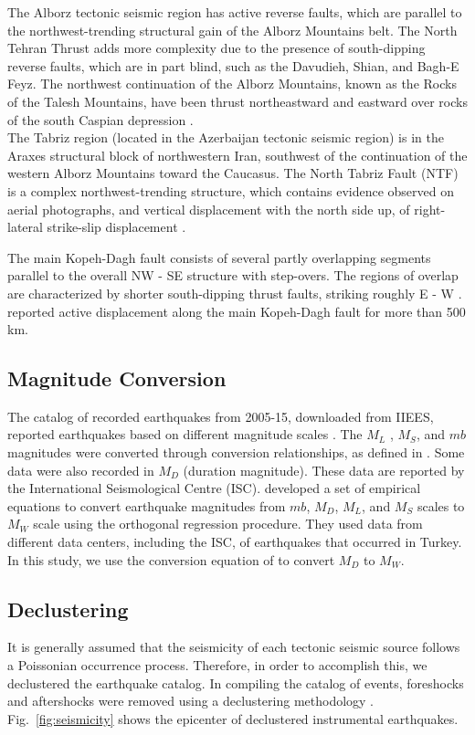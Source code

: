\noindent
The Alborz tectonic seismic region has active reverse faults, which are parallel to the northwest-trending structural gain of the Alborz Mountains belt. The North Tehran Thrust adds more complexity due to the presence of south-dipping reverse faults, which are in part blind, such as the Davudieh, Shian, and Bagh-E Feyz. The northwest continuation of the Alborz Mountains, known as the Rocks of the Talesh Mountains, have been thrust northeastward and eastward over rocks of the south Caspian depression  \citep{Berberian1999}.\\ 
\noindent
The Tabriz region (located in the Azerbaijan tectonic seismic region) is in the Araxes structural block of northwestern Iran, southwest of the continuation of the western Alborz Mountains toward the Caucasus. The North Tabriz Fault (NTF) is a complex northwest-trending structure, which contains evidence observed on aerial photographs, and vertical displacement with the north side up, of right-lateral strike-slip displacement  \citep{Berberian1999}.

The main Kopeh-Dagh fault consists of several partly overlapping segments parallel to the overall  NW - SE  structure with step-overs. The regions of overlap are characterized by shorter south-dipping thrust faults, striking roughly E - W  \citep{Berberian2001}.  \citet{Trifonov1978}  reported active displacement along the main Kopeh-Dagh fault for more than 500 km. 

\subsection{Magnitude Conversion}
\noindent
The catalog of recorded earthquakes from 2005-15, downloaded from IIEES, reported earthquakes based on different magnitude scales \citep{IIEES}. The  $M_L$ ,  $M_S$, and  $mb$  magnitudes were converted through conversion relationships, as defined in  \citet{Zare2014}. Some data were also recorded in  $M_D$  (duration magnitude). These data are reported by the International Seismological Centre (ISC).   \citet{Deniz2010}  developed a set of empirical equations to convert earthquake magnitudes from  $mb$,  $M_D$,  $M_L$, and  $M_S$  scales to  $M_W$  scale using the orthogonal regression procedure. They used data from different data centers, including the ISC, of earthquakes that occurred in Turkey. In this study, we use the conversion equation of  \citet{Deniz2010}  to convert  $M_D$  to  $M_W$. 

\subsection{Declustering} 
\noindent
It is generally assumed that the seismicity of each tectonic seismic source follows a Poissonian occurrence process. Therefore, in order to accomplish this, we declustered the earthquake catalog. In compiling the catalog of events, foreshocks and aftershocks were removed using a declustering methodology  \citep{Gardner1974}. Fig.~\ref{fig:seismicity}  shows the epicenter of declustered instrumental  earthquakes.

